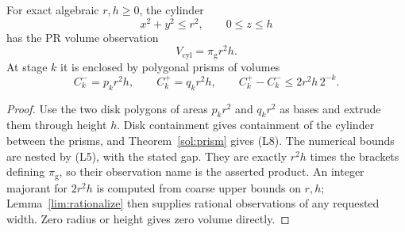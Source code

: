 \begin{theorem}
\label{lim:cylinder}
For exact algebraic $r,h\ge0$, the cylinder
\[
 x^2+y^2\le r^2,\qquad 0\le z\le h
\]
has the PR volume observation
\[
 V_{\mathrm{cyl}}=\pi_{\mathrm g}r^2h.
\]
At stage $k$ it is enclosed by polygonal prisms of volumes
\[
 C_k^-=p_kr^2h,\qquad C_k^+=q_kr^2h,
 \qquad C_k^+-C_k^-\le2r^2h\,2^{-k}.                 \tag{L8}
\]
\end{theorem}
\begin{proof}
Use the two disk polygons of areas $p_kr^2$ and $q_kr^2$ as bases and
extrude them through height $h$. Disk containment gives containment of
the cylinder between the prisms, and Theorem~\ref{sol:prism} gives
(L8). The numerical bounds are nested by (L5), with the stated gap.
They are exactly $r^2h$ times the brackets defining $\pi_{\mathrm g}$,
so their observation name is the asserted product.
An integer majorant for $2r^2h$ is computed from coarse upper bounds on
$r,h$; Lemma~\ref{lim:rationalize} then supplies rational observations
of any requested width. Zero radius or height gives zero volume directly.
\end{proof}

